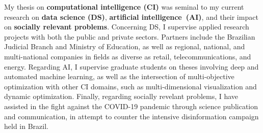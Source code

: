 \documentclass[11pt,a4paper,sans]{moderncv} %
\begin{document}
\makecvtitle %

\vspace{-1.cm}



My thesis on \textbf{computational intelligence (CI)} was seminal to my current research on \textbf{data science (DS)}, \textbf{artificial intelligence~(AI)}, and their impact on \textbf{socially relevant problems}. Concerning DS, I supervise applied research projects with both the public and private sectors. Partners include the Brazilian Judicial Branch and Ministry of Education, as well as regional, national, and multi-national companies in fields as diverse as retail, telecommunications, and energy. Regarding AI, I supervise graduate students on theses involving deep and automated machine learning, as well as the intersection of multi-objective optimization with other CI domains, such as multi-dimensional visualization and dynamic optimization. Finally, regarding socially revelant problems, I have assisted in the fight against the COVID-19 pandemic through science publication and communication, in attempt to counter the intensive disinformation campaign held in Brazil. 

\end{document}
